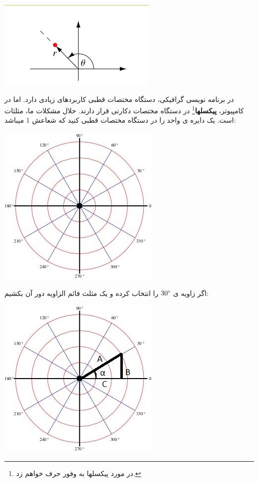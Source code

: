 \documentclass[14pt,a4paper]{memoir}
\begin{document}
	 
	 
	 	  \begin{center}
	 	\includegraphics[scale=1]{Polar}
	 \end{center}
 
 در برنامه نویسی گرافیکی، دستگاه مختصات قطبی کاربردهای زیادی دارد. اما در کامپیوتر، \textbf{پیکسلها}\footnote{در مورد پیکسلها به وفور حرف خواهم زد.} در دستگاه مختصات دکارتی قرار دارند. حلال مشکلات ما، مثلثات است.
 یک دایره ی واحد را در دستگاه مختصات  قطبی کنید که شعاعش 1 میباشد:
  \begin{center}
 	\includegraphics[scale=1]{UnitCIrcle}
 \end{center}

اگر زاویه ی $   30\degree   $ را انتخاب کرده و یک مثلث قائم الزاویه دور آن بکشیم:


	   \begin{center}
	 	\includegraphics[scale=1]{ThirtyDegrees}
	 \end{center}
	 
\end{document}
